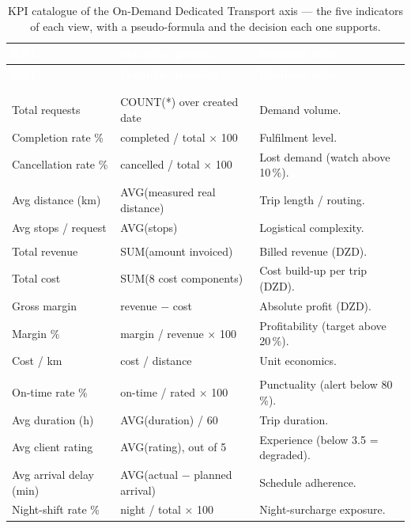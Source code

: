 \begingroup
\small
\renewcommand{\arraystretch}{1.22}
\begin{xltabular}{\linewidth}{|>{\raggedright\arraybackslash}p{3.0cm}|>{\raggedright\arraybackslash}X|>{\raggedright\arraybackslash}p{3.6cm}|}
\caption{KPI catalogue of the On-Demand Dedicated Transport axis --- the five indicators of each view,
with a pseudo-formula and the decision each one supports.}
\label{tab:ch4-dash-kpi-transport} \\
\hline
{}
\textcolor{white}{\textbf{KPI}} & \textcolor{white}{\textbf{Formula (pseudo)}} &
\textcolor{white}{\textbf{Business value}} \\
\hline
\endfirsthead
\hline
{}
\textcolor{white}{\textbf{KPI}} & \textcolor{white}{\textbf{Formula (pseudo)}} &
\textcolor{white}{\textbf{Business value}} \\
\hline
\endhead
\hline
{} \\
\endfoot
\endlastfoot
{} \\
\hline
Total requests & COUNT(*) over created date & Demand volume. \\
Completion rate \% & completed / total $\times$ 100 & Fulfilment level. \\
Cancellation rate \% & cancelled / total $\times$ 100 & Lost demand (watch above 10\,\%). \\
Avg distance (km) & AVG(measured real distance) & Trip length / routing. \\
Avg stops / request & AVG(stops) & Logistical complexity. \\
\hline
{} \\
\hline
Total revenue & SUM(amount invoiced) & Billed revenue (DZD). \\
Total cost & SUM(8 cost components) & Cost build-up per trip (DZD). \\
Gross margin & revenue $-$ cost & Absolute profit (DZD). \\
Margin \% & margin / revenue $\times$ 100 & Profitability (target above 20\,\%). \\
Cost / km & cost / distance & Unit economics. \\
\hline
{} \\
\hline
On-time rate \% & on-time / rated $\times$ 100 & Punctuality (alert below 80\,\%). \\
Avg duration (h) & AVG(duration) / 60 & Trip duration. \\
Avg client rating & AVG(rating), out of 5 & Experience (below 3.5 = degraded). \\
Avg arrival delay (min) & AVG(actual $-$ planned arrival) & Schedule adherence. \\
Night-shift rate \% & night / total $\times$ 100 & Night-surcharge exposure. \\
\hline
\end{xltabular}
\endgroup

